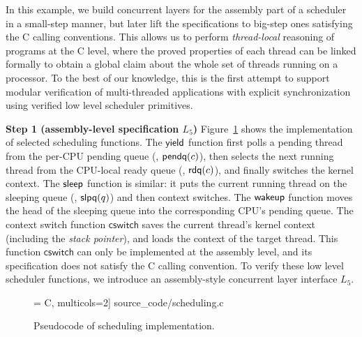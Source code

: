 In this example, we build concurrent layers for the assembly part
of a scheduler in a small-step manner, but later lift the specifications
to big-step ones satisfying the C calling conventions. 
This allows us to perform \emph{thread-local} reasoning of programs
at the C level, where the proved properties of each thread can be linked formally
to obtain a global claim about the whole set of threads running on a processor.
To the best of our knowledge, this is the first attempt to support modular verification
of multi-threaded applications with explicit synchronization using verified
low level scheduler primitives.

\vspace{3pt}
\noindent\textbf{Step 1 (assembly-level specification $L_5$)} 
Figure~\ref{fig:exp:sched} shows the implementation
of selected scheduling functions.
The $\mathsf{yield}$ function first polls a pending
thread from the per-CPU pending queue
(\ie, $\mathsf{pendq}(c)$),
then selects the next running thread
from the CPU-local ready queue
(\ie, $\mathsf{rdq}(c)$),
and finally switches the kernel context.
The $\mathsf{sleep}$ function is similar: it
puts the current running thread
on the sleeping queue (\ie, $\mathsf{slpq}(q)$) and
then context switches.
The $\mathsf{wakeup}$ function moves the head of the sleeping queue
into the corresponding CPU's pending queue.
The context switch function $\mathsf{cswitch}$
saves the current thread's kernel context (including the 
\emph{stack pointer}),
and loads the context of the target thread.
This function $\mathsf{cswitch}$ can only be implemented at the assembly level,
and its specification does not satisfy the C calling convention.
To verify these low level scheduler functions, we introduce an
assembly-style concurrent layer interface $L_5$.
\begin{figure}
 = C, multicols=2] {source_code/scheduling.c}
\vspace{-10pt}
\caption{Pseudocode of scheduling implementation.}
\label{fig:exp:sched}
\vspace{-10pt}
\end{figure}


